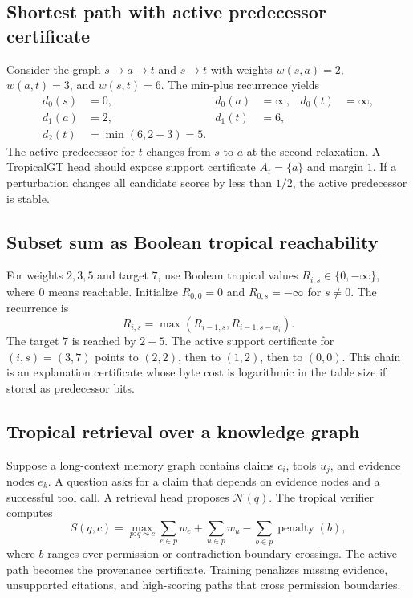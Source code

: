 \documentclass[11pt]{article}
\newcommand{\calN}{\mathcal{N}}
\begin{document}
\subsection{Shortest path with active predecessor certificate}
Consider the graph $s\to a\to t$ and $s\to t$ with weights $w(s,a)=2$, $w(a,t)=3$, and $w(s,t)=6$. The min-plus recurrence yields
\begin{align}
d_0(s)&=0,& d_0(a)&=\infty,& d_0(t)&=\infty,\\
d_1(a)&=2,& d_1(t)&=6,\\
d_2(t)&=\min(6,2+3)=5.
\end{align}
The active predecessor for $t$ changes from $s$ to $a$ at the second relaxation. A TropicalGT head should expose support certificate $A_t=\{a\}$ and margin $1$. If a perturbation changes all candidate scores by less than $1/2$, the active predecessor is stable.

\subsection{Subset sum as Boolean tropical reachability}
For weights $2,3,5$ and target $7$, use Boolean tropical values $R_{i,s}\in\{0,-\infty\}$, where $0$ means reachable. Initialize $R_{0,0}=0$ and $R_{0,s}=-\infty$ for $s\ne0$. The recurrence is
\begin{equation}
R_{i,s}=\max(R_{i-1,s},R_{i-1,s-w_i}).
\end{equation}
The target $7$ is reached by $2+5$. The active support certificate for $(i,s)=(3,7)$ points to $(2,2)$, then to $(1,2)$, then to $(0,0)$. This chain is an explanation certificate whose byte cost is logarithmic in the table size if stored as predecessor bits.

\subsection{Tropical retrieval over a knowledge graph}
Suppose a long-context memory graph contains claims $c_i$, tools $u_j$, and evidence nodes $e_k$. A question asks for a claim that depends on evidence nodes and a successful tool call. A retrieval head proposes $\calN(q)$. The tropical verifier computes
\begin{equation}
S(q,c)=\max_{p:q\leadsto c}\sum_{e\in p}w_e+\sum_{u\in p}w_u-\sum_{b\in p}\operatorname{penalty}(b),
\end{equation}
where $b$ ranges over permission or contradiction boundary crossings. The active path becomes the provenance certificate. Training penalizes missing evidence, unsupported citations, and high-scoring paths that cross permission boundaries.
\end{document}
